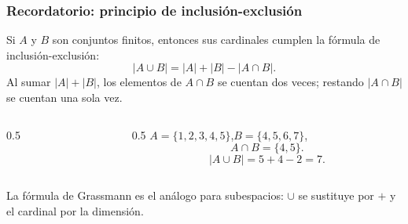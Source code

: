 \begin{frame}
    \frametitle{Recordatorio: principio de inclusión-exclusión}

    Si $A$ y $B$ son conjuntos finitos, entonces sus cardinales cumplen la \alert{fórmula de inclusión-exclusión}:
    \[
        |A\cup B|=|A|+|B|-|A\cap B|.
    \]
    Al sumar $|A|+|B|$, los elementos de $A\cap B$ se cuentan
    \alert{dos veces}; restando $|A\cap B|$ se cuentan una sola vez.

    \begin{example}
        \begin{columns}[c]
            \begin{column}{0.5\textwidth}
                \centering
            \end{column}
            \begin{column}{0.5\textwidth}
                $A=\{1,2,3,4,5\}$,\quad $B=\{4,5,6,7\}$,
                \[
                    A\cap B=\{4,5\}.
                \]
                \[
                    |A\cup B|=5+4-2=7.
                \]
            \end{column}
        \end{columns}
    \end{example}

    La fórmula de Grassmann es el análogo para subespacios:
    $\cup$ se sustituye por $+$ y el cardinal por la dimensión.
\end{frame}



